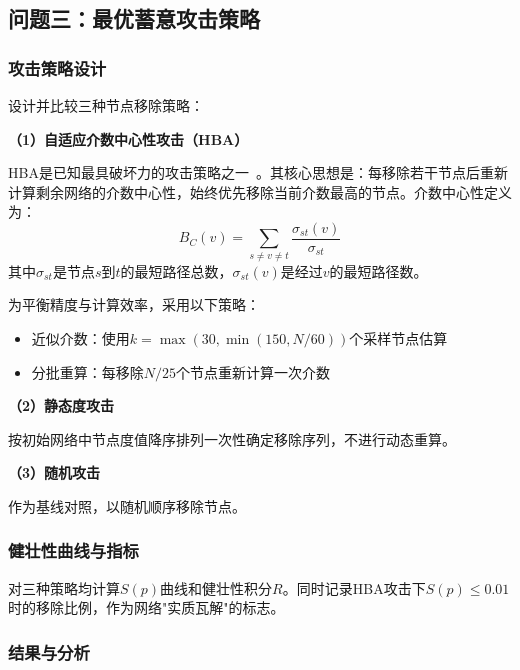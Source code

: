 \documentclass[12pt,a4paper]{article}
\begin{document}
\subsection{问题三：最优蓄意攻击策略}

\subsubsection{攻击策略设计}

设计并比较三种节点移除策略：

\textbf{（1）自适应介数中心性攻击（HBA）}

HBA是已知最具破坏力的攻击策略之一~\cite{holme2002attack}。其核心思想是：每移除若干节点后重新计算剩余网络的介数中心性，始终优先移除当前介数最高的节点。介数中心性定义为：
\begin{equation}
B_C(v) = \sum_{s \neq v \neq t} \frac{\sigma_{st}(v)}{\sigma_{st}}
\end{equation}
其中$\sigma_{st}$是节点$s$到$t$的最短路径总数，$\sigma_{st}(v)$是经过$v$的最短路径数。

为平衡精度与计算效率，采用以下策略：
\begin{itemize}[leftmargin=2em]
    \item 近似介数：使用$k = \max(30, \min(150, N/60))$个采样节点估算
    \item 分批重算：每移除$N/25$个节点重新计算一次介数
\end{itemize}

\textbf{（2）静态度攻击}

按初始网络中节点度值降序排列一次性确定移除序列，不进行动态重算。

\textbf{（3）随机攻击}

作为基线对照，以随机顺序移除节点。

\subsubsection{健壮性曲线与指标}

对三种策略均计算$S(p)$曲线和健壮性积分$R$。同时记录HBA攻击下$S(p) \leq 0.01$时的移除比例，作为网络"实质瓦解"的标志。

\subsubsection{结果与分析}
\end{document}
